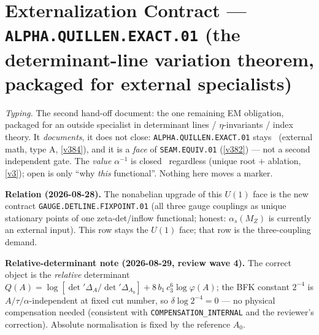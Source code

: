 \section*{Externalization Contract --- \texttt{ALPHA.QUILLEN.EXACT.01} (the determinant-line variation theorem, packaged for external specialists)}
\noindent\emph{Typing.} The second hand-off document: the one remaining EM obligation, packaged
for an outside specialist in determinant lines / $\eta$-invariants / index theory. It
\emph{documents}, it does not close: \texttt{ALPHA.QUILLEN.EXACT.01} stays \mO\ (external math,
type A, \vref{v384}), and it is a \emph{face} of \texttt{SEAM.EQUIV.01} (\vref{v382}) --- not a
second independent gate. The \emph{value} $\alpha^{-1}$ is closed \mE\ regardless (unique root
$+$ ablation, \vref{v3}); open is only ``why \emph{this} functional''. Nothing here moves a
marker.

\par\smallskip\noindent\textbf{Relation (2026-08-28).}  The nonabelian upgrade of this $U(1)$
face is the new contract \texttt{GAUGE.DETLINE.FIXPOINT.01} (all three gauge couplings as unique
stationary points of one zeta-det/inflow functional; honest: $\alpha_s(M_Z)$ is currently an
external input).  This row stays the $U(1)$ face; that row is the three-coupling demand.

\par\smallskip\noindent\textbf{Relative-determinant note (2026-08-29, review wave 4).}
The correct object is the \emph{relative} determinant
$Q(A)=\log[\det'\Delta_A/\det'\Delta_{A_0}]+8\,b_1\,c_3^6\log\varphi(A)$;
the BFK constant $2^{-4}$ is $A/\tau/\alpha$-independent at fixed cut number, so
$\delta\log 2^{-4}=0$ --- no physical compensation needed (consistent with
\texttt{COMPENSATION\_INTERNAL} and the reviewer's correction).  Absolute normalisation is
fixed by the reference $A_0$.

